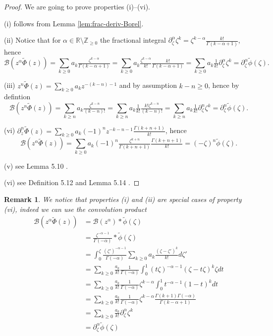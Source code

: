 \documentclass{article}
\newcommand{\Z}{\mathbb{Z}}
\newcommand{\R}{\mathbb{R}}
\newcommand{\borel}{\mathcal{B}}
\newtheorem{remark}[definition]{Remark}
\begin{document}
\begin{proof} 

We are going to prove properties (i)--(vi). 

(i) follows from Lemma \ref{lem:frac-deriv-Borel}. 

(ii) Notice that for $\alpha\in\R\setminus\Z_{\geq 0}$ the fractional integral $\partial_\zeta^{\alpha}\zeta^{k}=\zeta^{k-\alpha}\tfrac{k!}{\Gamma(k-\alpha+1)}$, hence \[\borel (z^\alpha \tilde{\Phi}(z))=\sum_{k\geq 0}a_k\tfrac{\zeta^{k-\alpha}}{\Gamma(k-\alpha+1)}=\sum_{k\geq 0}a_k\tfrac{\zeta^{k-\alpha}}{k!}\tfrac{k!}{\Gamma(k-\alpha+1)}=\sum_{k\geq 0}a_k \tfrac{1}{k!}\partial_\zeta^{\alpha}\zeta^k=\partial_\zeta^\alpha\tilde{\phi}(\zeta).\]

(iii) $z^n\tilde{\Phi}(z)=\sum_{k\geq 0}a_kz^{-(k-n)-1} $ and by assumption $k-n\geq 0$, hence by defintion \[\borel (z^n \tilde{\Phi}(z))=\sum_{k\geq n} a_k\tfrac{\zeta^{k-n}}{(k-n)!}=\sum_{k\geq n} a_k\tfrac{1}{k!}\tfrac{k!\zeta^{k-n}}{(k-n)!}=\sum_{k\geq n} a_k\tfrac{1}{k!}\partial_\zeta^n\zeta^k=\partial_\zeta^n\tilde{\phi}(\zeta).\] 

(vi) $\partial_z^n \tilde{\Phi}(z)=\sum_{k\geq 0}a_k(-1)^{n}z^{-k-n-1}\tfrac{\Gamma(k+n+1)}{k!}$, hence \[\borel (z^\alpha \tilde{\Phi}(z))=\sum_{k\geq 0}a_k(-1)^{n}\tfrac{\zeta^{k+n}}{\Gamma(k+n+1)}\tfrac{\Gamma(k+n+1)}{k!}=(-\zeta)^{n}\tilde{\phi}(\zeta).\]

(v) see Lemma 5.10 \cite{MS16}. 

(vi) see Definition 5.12 and Lemma 5.14 \cite{MS16}. 
\end{proof}

\begin{remark}
We notice that properties (i) and (ii) are special cases of property (vi), indeed we can use the convolution product 
\begin{align*}
\borel (z^\alpha \tilde{\Phi}(z))&=\borel (z^\alpha)\ast \tilde{\phi}(\zeta)\\
&=\frac{\zeta^{-\alpha-1}}{\Gamma(-\alpha)}\ast\tilde{\phi}(\zeta)\\
&=\int_0^\zeta \frac{(\zeta')^{-\alpha-1}}{\Gamma(-\alpha)}\sum_{k\geq 0}a_k\frac{(\zeta-\zeta')^k}{k!}d\zeta'\\
&=\sum_{k\geq 0}\frac{a_k}{k!}\frac{1}{\Gamma(-\alpha)}\int_0^1(t\zeta)^{-\alpha-1}(\zeta-t\zeta)^k\zeta dt\\
&=\sum_{k\geq 0}\frac{a_k}{k!}\frac{1}{\Gamma(-\alpha)}\zeta^{k-\alpha}\int_0^1 t^{-\alpha-1}(1-t)^k dt\\
&=\sum_{k\geq 0}\frac{a_k}{k!}\frac{1}{\Gamma(-\alpha)}\zeta^{k-\alpha}\frac{\Gamma(k+1)\Gamma(-\alpha)}{\Gamma(k-\alpha+1)}\\
&=\sum_{k\geq 0}\frac{a_k}{k!}\partial_\zeta^{\alpha} \zeta^k \\
&=\partial_\zeta^\alpha\tilde{\phi}(\zeta)
\end{align*}
\end{remark}
\end{document}
